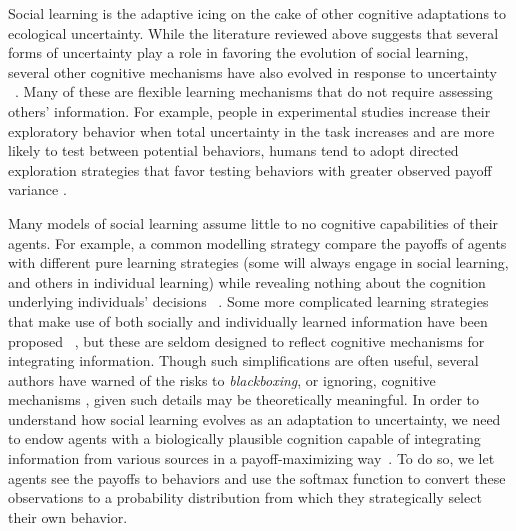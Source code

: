 \documentclass[letterpaper,11.5pt]{scrartcl}
\newcommand{\cm}[1]{{\textcolor{mypurple} {({\tiny CM:} #1)}}}
\newcommand{\ps}[1]{{\textcolor{mygreen} {({\tiny PS:} #1)}}}
\begin{document}
Social learning is the adaptive icing on the cake of other cognitive adaptations
to ecological uncertainty.  While the literature reviewed above suggests that
several forms of uncertainty play a role in favoring the evolution of social
learning, several other cognitive mechanisms have also evolved in response to
uncertainty ~\cite{volz2012}. Many of these are flexible learning mechanisms that
do not require assessing others' information. For example, people in experimental
studies increase their exploratory behavior when total uncertainty in the task
increases and are more likely to test %
between potential behaviors, humans tend to adopt directed exploration strategies
that favor testing behaviors with greater observed payoff variance
\cite{Wilson2014,Gershman2019}.

Many models of social learning assume little to no cognitive capabilities
of their agents. For example, a common modelling strategy compare the payoffs of
agents with different pure learning strategies (some will always engage in social
learning, and others in individual learning) while revealing nothing about the
cognition underlying individuals' decisions  ~\cite{BoydRicherson1985, Rogers1988,
aoki2005}. Some more complicated learning strategies that make use of both
socially and individually learned information have been proposed
~\cite{Enquist2007, perreault2012bayesian}, but these are seldom designed to
reflect cognitive mechanisms for integrating information. Though such
simplifications are often useful, several authors have warned of the risks to
\emph{blackboxing}, or ignoring, cognitive mechanisms \cite[p. 658]{Heyes2016,
Kendal2018}, given such details may be theoretically meaningful. In order to
understand how social learning evolves as an adaptation to uncertainty, we need to
endow agents with a biologically plausible cognition capable of integrating
information from various sources in a payoff-maximizing way~\cite{Gershman2019}. 
To do so, we let
agents see the payoffs to behaviors and use the softmax function to convert these
observations to a probability distribution from which they strategically select
their own behavior. %

\end{document}
